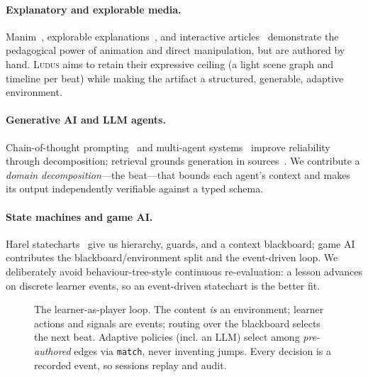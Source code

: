 \documentclass[sigconf,review,anonymous]{acmart}
\newcommand{\sys}{\textsc{Ludus}\xspace}
\begin{document}
\paragraph{Explanatory and explorable media.} Manim~\cite{manim},
explorable explanations~\cite{victor2011explorable}, and interactive
articles~\cite{hohman2020scrolly} demonstrate the pedagogical power of animation
and direct manipulation, but are authored by hand. \sys{} aims to retain their
expressive ceiling (a light scene graph and timeline per beat) while making the
artifact a structured, generable, adaptive environment.

\paragraph{Generative AI and LLM agents.} Chain-of-thought
prompting~\cite{wei2022chain} and multi-agent
systems~\cite{park2023generative} improve reliability through decomposition;
retrieval grounds generation in sources~\cite{lewis2020rag}. We contribute a
\emph{domain decomposition}---the beat---that bounds each agent's context and
makes its output independently verifiable against a typed schema.

\paragraph{State machines and game AI.} Harel
statecharts~\cite{harel1987statecharts} give us hierarchy, guards, and a context
blackboard; game AI~\cite{millington2019ai} contributes the
blackboard/environment split and the event-driven loop. We deliberately avoid
behaviour-tree-style continuous re-evaluation: a lesson advances on discrete
learner events, so an event-driven statechart is the better fit.

\begin{figure}[t]
  \centering
  \resizebox{\columnwidth}{!}{}
  \caption{The learner-as-player loop. The content \emph{is} an environment;
  learner actions and signals are events; routing over the blackboard selects
  the next beat. Adaptive policies (incl. an LLM) select among \emph{pre-authored}
  edges via \texttt{match}, never inventing jumps. Every decision is a recorded
  event, so sessions replay and audit.}
  \label{fig:player}
\end{figure}

\end{document}
